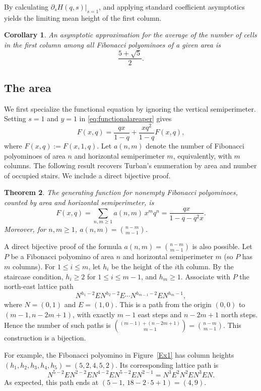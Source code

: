\documentclass[12pt]{amsart}
\theoremstyle{plain}
\newtheorem{theorem}{Theorem}[section]
\newtheorem{coro}[theorem]{Corollary}
\theoremstyle{definition}
\begin{document}
By calculating $\partial_sH(q,s)\vert_{s=1}$, and applying
standard coefficient asymptotics \cite{Fla,Orl} yields the limiting mean height of the first column.

\begin{coro}\label{coroasympt} An asymptotic approximation for the average of the number of cells in the first column among all Fibonacci polyominoes of a given area is  $$\frac{5+\sqrt{5}}{2}.$$
\end{coro}


\subsection{The area}

We first specialize the functional equation by ignoring the vertical
semiperimeter. Setting $s=1$ and $y=1$ in
\eqref{eq:functionalareaper} gives 
\[F(x,q)=\frac{qx}{1-q}+ \frac{xq^2}{1-q}F(x,q),\]
where $F(x,q):=F(x,1,q)$. Let $a(n,m)$ denote the number of Fibonacci polyominoes of area $n$ and horizontal semiperimeter $m$, equivalently, with $m$ columns. The following result recovers Turban’s enumeration by area and number of occupied stairs. We include a direct bijective proof. 

\begin{theorem}
The generating function for nonempty Fibonacci polyominoes, counted by area and horizontal semiperimeter, is
\[
F(x,q)=\sum_{n,m\geq 1} a(n,m)\,x^{m}q^{n}
     = \frac{qx}{1 - q - q^{2}x}.
\]
Moreover, for $n, m\geq 1$, $a(n,m)=\binom{n-m}{m-1}$.
\end{theorem}

A direct bijective proof of the formula $a(n,m)=\binom{n-m}{m-1}$ is also possible. Let $P$ be a Fibonacci polyomino of area $n$ and horizontal semiperimeter $m$ (so $P$ has $m$ columns). For $1\leq i\leq m$, let $h_i$ be the height of the $i$th column. By the staircase condition,  $h_i\geq 2$ for $1\leq i\leq m-1$, and $h_m\geq 1$.  Associate with $P$ the north-east lattice path
\[N^{h_1-2}EN^{h_2-2}E \cdots N^{h_{m-1}-2}EN^{h_{m}-1},\] where $N=(0,1)$ and $E=(1,0)$. This is a path from the origin $(0,0)$ to  $(m-1,n-2m+1)$, with exactly $m-1$ east steps and $n-2m+1$ north steps. Hence the number of such paths is $\binom{(m-1)+(n-2m+1)}{m-1}=\binom{n-m}{m-1}$. This construction is a bijection.


For example, the Fibonacci polyomino in Figure~\ref{Ex1} has column heights
$(h_1,h_2,h_3,h_4,h_5)=(5,2,4,5,2)$. Its corresponding lattice path is \[N^{5-2}EN^{2-2}EN^{4-2}EN^{5-2}EN^{2-1}=N^{3}E^2N^{2}EN^{3}EN.\] 
As expected, this path ends at $(5-1,\,18-2\cdot 5+1)=(4,9)$.
\end{document}
